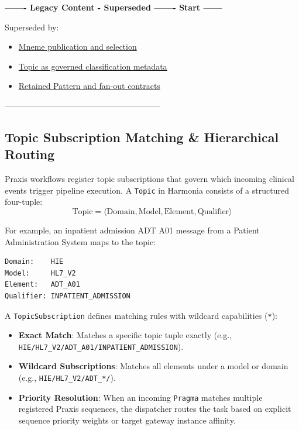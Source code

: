 \par\noindent\textbf{------- Legacy Content - Superseded ------- Start ------}
\par\noindent Superseded by:
\begin{itemize}
  \item \href{../../markdown/05-information-systems-architecture/pathways-journeys-and-handoff.md\#publication-and-selection}{Mneme publication and selection}
  \item \href{../../markdown/05-information-systems-architecture/pathways-journeys-and-handoff.md\#pragma-and-topic}{Topic as governed classification metadata}
  \item \href{../../markdown/05-information-systems-architecture/gaps.md}{Retained Pattern and fan-out contracts}
\end{itemize}
\noindent ---------------------------------------------------------

\subsection{Topic Subscription Matching \& Hierarchical Routing}
\label{subsec:praxis_topic_subscriptions}

Praxis workflows register topic subscriptions that govern which incoming clinical events trigger pipeline execution. A \texttt{Topic} in Harmonia consists of a structured four-tuple:
\begin{equation}
\text{Topic} = \langle \text{Domain}, \text{Model}, \text{Element}, \text{Qualifier} \rangle
\end{equation}

For example, an inpatient admission ADT A01 message from a Patient Administration System maps to the topic:
\begin{lstlisting}[caption={Hierarchical Topic Representation}]
Domain:    HIE
Model:     HL7_V2
Element:   ADT_A01
Qualifier: INPATIENT_ADMISSION
\end{lstlisting}

A \texttt{TopicSubscription} defines matching rules with wildcard capabilities (\texttt{*}):
\begin{itemize}
    \item \textbf{Exact Match}: Matches a specific topic tuple exactly (e.g., \texttt{HIE/HL7\_V2/ADT\_A01/INPATIENT\_ADMISSION}).
    \item \textbf{Wildcard Subscriptions}: Matches all elements under a model or domain (e.g., \texttt{HIE/HL7\_V2/ADT\_*/\allowbreak *}).
    \item \textbf{Priority Resolution}: When an incoming \texttt{Pragma} matches multiple registered Praxis sequences, the dispatcher routes the task based on explicit sequence priority weights or target gateway instance affinity.
\end{itemize}


